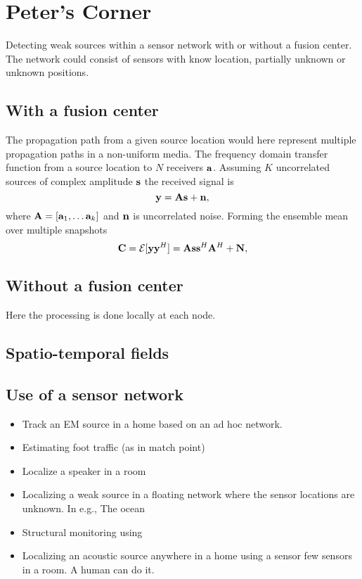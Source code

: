\documentclass{article}
\begin{document}
\section{Peter's Corner}


Detecting weak sources within a sensor network with or without a fusion center. The network could consist of sensors with know location, partially unknown or unknown positions.


\subsection{With a fusion center}
The propagation path from a given source location would here represent multiple propagation paths in a non-uniform media. The frequency domain transfer function from a source location to $N$ receivers ${\bf a}$. Assuming $K$ uncorrelated sources of complex amplitude $\bf s$ the received signal is 
\begin{equation}
{\bf y}={\bf A}{\bf s}+{\bf n},
\end{equation}
where ${\bf A}=[{\bf a}_1, \dots {\bf a}_k ]$  and $\bf n$ is uncorrelated noise. 
Forming the ensemble mean over multiple snapshots 
\begin{equation}
{\bf C}={\cal E}[{\bf y} {\bf y}^H]= {\bf A}{\bf s}{\bf s}^H{\bf A}^H+{\bf N},
\end{equation}

\subsection{Without a fusion center}
Here the processing is done locally at each node.

\subsection{Spatio-temporal fields}

\subsection{Use of a sensor network}
\begin{itemize}
\item Track an EM source in a home based on an ad hoc network. 
\item Estimating foot traffic (as in match point)
\item Localize a speaker in a room
\item Localizing a weak source in a floating network where the sensor locations are unknown. In e.g., The ocean
\item Structural monitoring using 
\item Localizing an acoustic source anywhere in a home using a sensor few sensors in a room. A human can do it. 
\end{itemize}
\end{document}
